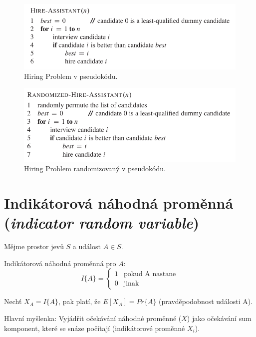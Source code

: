 \begin{figure}[H]
    \centering
    \includegraphics[width=0.8\linewidth]{hiring_problem.pdf}
    \caption{Hiring Problem v pseudokódu.}
\end{figure}

\begin{figure}[H]
    \centering
    \includegraphics[width=0.8\linewidth]{hiring_problem_randomized.pdf}
    \caption{Hiring Problem randomizovaný v pseudokódu.}
\end{figure}


\section{Indikátorová náhodná proměnná (\textit{indicator random variable})}

\begin{compactitem}
    \item Mějme prostor jevů $S$ a událost $A \in S$.

    \item Indikátorová náhodná proměnná pro $A$:
    $$ I\{A\} = \left\{
        \begin{array}{ll}
            1 & \text{pokud A nastane} \\
            0 & \text{jinak}
        \end{array}
    \right. $$

    \item Nechť $X_A = I\{A\}$, pak platí, že $E[X_A] = Pr\{A\}$ (pravděpodobnost události A).

    \item Hlavní myšlenka: Vyjádřit očekávání náhodné proměnné ($X$) jako očekávání sum komponent, které se snáze počítají (indikátorové proměnné $X_i$).

\end{compactitem}

